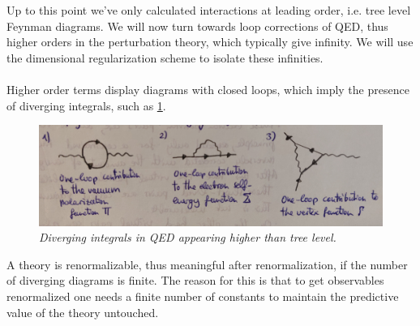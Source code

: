 \\
\\
Up to this point we've only calculated interactions at leading order, i.e. tree level Feynman diagrams. We will now turn towards loop corrections of QED, thus higher orders in the perturbation theory, which typically give infinity. We will use the dimensional regularization scheme to isolate these infinities.\\
\\
Higher order terms display diagrams with closed loops, which imply the presence of diverging integrals, such as \ref{fig:divergingintegralsqed}.
\begin{figure}[h!]
	\centering
	\includegraphics[width=0.7\linewidth]{gfx/DivergingIntegralsQED}
	\caption{\itshape Diverging integrals in QED appearing higher than tree level.}
	\label{fig:divergingintegralsqed}
\end{figure}
A theory is renormalizable, thus meaningful after renormalization, if the number of diverging diagrams is finite. The reason for this is that to get observables renormalized one needs a finite number of constants to maintain the predictive value of the theory untouched.
